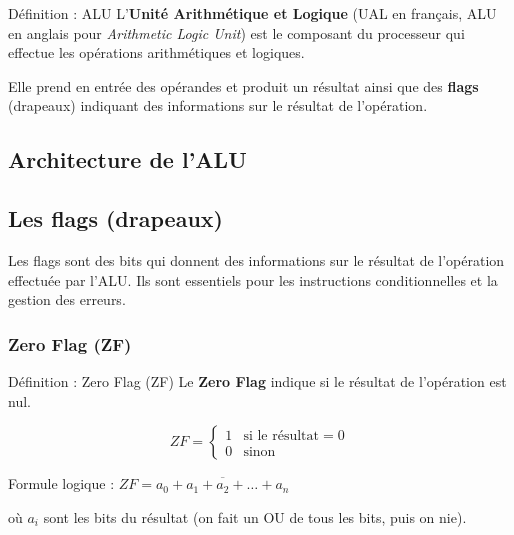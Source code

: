 \documentclass[a4paper,12pt]{article}
\begin{document}
\begin{defbox}{Définition : ALU}
L'\textbf{Unité Arithmétique et Logique} (UAL en français, ALU en anglais pour \textit{Arithmetic Logic Unit}) est le composant du processeur qui effectue les opérations arithmétiques et logiques.

Elle prend en entrée des opérandes et produit un résultat ainsi que des \textbf{flags} (drapeaux) indiquant des informations sur le résultat de l'opération.
\end{defbox}

\subsection{Architecture de l'ALU}

\begin{center}
\end{center}

\subsection{Les flags (drapeaux)}

Les flags sont des bits qui donnent des informations sur le résultat de l'opération effectuée par l'ALU. Ils sont essentiels pour les instructions conditionnelles et la gestion des erreurs.

\subsubsection{Zero Flag (ZF)}

\begin{defbox}{Définition : Zero Flag (ZF)}
Le \textbf{Zero Flag} indique si le résultat de l'opération est nul.

\[ZF = \begin{cases}
1 & \text{si le résultat} = 0 \\
0 & \text{sinon}
\end{cases}\]

Formule logique : $ZF = \overline{a_0 + a_1 + a_2 + \ldots + a_n}$

où $a_i$ sont les bits du résultat (on fait un OU de tous les bits, puis on nie).
\end{defbox}
\end{document}
